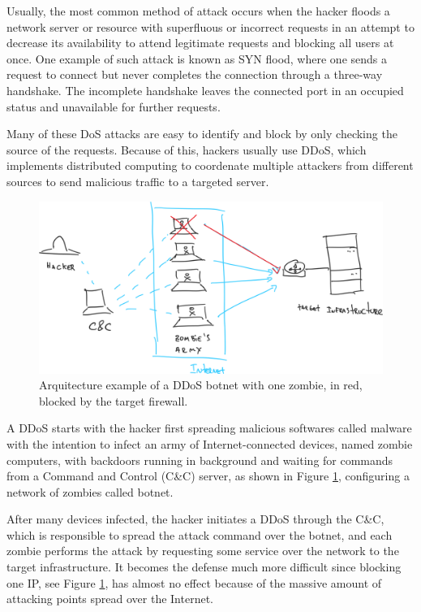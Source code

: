 \documentclass[a4paper,twoside]{article}
\begin{document}
Usually, the most common method of attack occurs when the hacker floods a network server or resource with superfluous or incorrect requests in an attempt to decrease its availability to attend legitimate requests and blocking all users at once. One example of such attack is known as SYN flood, where one sends a request to connect but never completes the connection through a three-way handshake. The incomplete handshake leaves the connected port in an occupied status and unavailable for further requests.

Many of these DoS attacks are easy to identify and block by only checking the source of the requests. Because of this, hackers usually use DDoS, which implements distributed computing to coordenate multiple attackers from different sources to send malicious traffic to a targeted server.

\begin{figure}[h]
	\centering
	\includegraphics[width=.9\linewidth]{img/DDoS-arch}
	\caption{Arquitecture example of a DDoS botnet with one zombie, in red, blocked by the target firewall.}
	\label{fig:DDoS-arch}
\end{figure}

A DDoS starts with the hacker first spreading malicious softwares called malware with the intention to infect an army of Internet-connected devices, named zombie computers, with backdoors running in background and waiting for commands from a Command and Control (C\&C) server, as shown in Figure \ref{fig:DDoS-arch}, configuring a network of zombies called botnet.

After many devices infected, the hacker initiates a DDoS through the C\&C, which is responsible to spread the attack command over the botnet, and each zombie performs the attack by requesting some service over the network to the target infrastructure. It becomes the defense much more difficult since blocking one IP, see Figure \ref{fig:DDoS-arch}, has almost no effect because of the massive amount of attacking points spread over the Internet.
\end{document}
